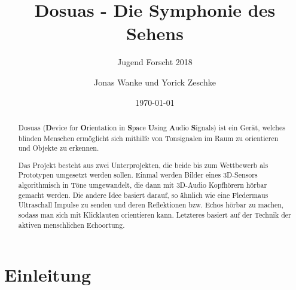 \documentclass[a4paper,12pt,ngerman]{scrartcl}
\title{Dosuas - Die Symphonie des Sehens}
\subtitle{Jugend Forscht 2018}
\author{Jonas Wanke und Yorick Zeschke}
\date{\today}
\begin{document}
\maketitle

\begin{abstract}
Dosuas (\textbf{D}evice for \textbf{O}rientation in \textbf{S}pace \textbf{U}sing 
\textbf{A}udio \textbf{S}ignals) ist ein Gerät, welches blinden Menschen ermöglicht
sich mithilfe von Tonsignalen im Raum zu orientieren und Objekte zu erkennen.\par
Das Projekt besteht aus zwei Unterprojekten, die beide bis zum 
Wettbewerb als Prototypen umgesetzt werden sollen. Einmal werden Bilder eines 3D-Sensors 
algorithmisch in Töne umgewandelt, die dann mit 3D-Audio Kopfhörern hörbar gemacht
werden. Die andere Idee basiert darauf, so ähnlich wie eine Fledermaus Ultraschall 
Impulse zu senden und deren Reflektionen bzw. Echos hörbar zu machen, sodass man
sich mit Klicklauten orientieren kann. Letzteres basiert auf der Technik der aktiven
menschlichen Echoortung.
\end{abstract}

\tableofcontents

\newpage


\section{Einleitung}
\end{document}
